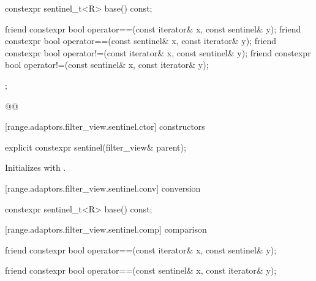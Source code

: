 {\begin{codeblock}
{{    constexpr sentinel_t<R> base() const;

    friend constexpr bool operator==(const iterator& x, const sentinel& y);
    friend constexpr bool operator==(const sentinel& x, const iterator& y);
    friend constexpr bool operator!=(const iterator& x, const sentinel& y);
    friend constexpr bool operator!=(const sentinel& x, const iterator& y);
  };
}@\oldtxt{\}}@
\end{codeblock}

[range.adaptors.filter_view.sentinel.ctor]{ constructors}

%
\begin{itemdecl}
explicit constexpr sentinel(filter_view& parent);
\end{itemdecl}

\begin{itemdescr}
\pnum
\effects Initializes  with .
\end{itemdescr}

[range.adaptors.filter_view.sentinel.conv]{ conversion}

%
\begin{itemdecl}
constexpr sentinel_t<R> base() const;
\end{itemdecl}

\begin{itemdescr}
\pnum
\oldtxt{\returns}  
\end{itemdescr}

[range.adaptors.filter_view.sentinel.comp]{ comparison}

%
\begin{itemdecl}
friend constexpr bool operator==(const iterator& x, const sentinel& y);
\end{itemdecl}

\begin{itemdescr}
\pnum
\oldtxt{\returns} 
\end{itemdescr}

%
\begin{itemdecl}
friend constexpr bool operator==(const sentinel& x, const iterator& y);
\end{itemdecl}

}
